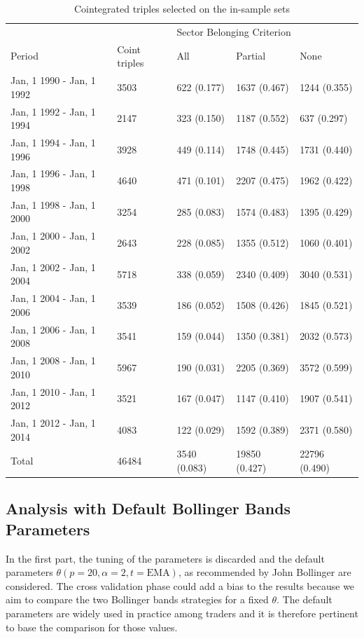 \documentclass[11pt,a4,twosided,singlespacing,titlepagenumber=on]{scrreprt}
\numberwithin{equation}{chapter} %
\theoremstyle{remark}
\begin{document}
\begin{table}[H]
\centering
\begin{tabular}{lllll}
\hline
                              && \multicolumn{3}{l}{Sector Belonging Criterion}  \\
Period & Coint triples & All & Partial & None \\
\hline
Jan, 1 1990 - Jan, 1 1992 & 3503    & 622 (0.177) & 1637 (0.467) & 1244 (0.355) \\
Jan, 1 1992 - Jan, 1 1994 & 2147    & 323 (0.150) & 1187 (0.552)  & 637 (0.297) \\
Jan, 1 1994 - Jan, 1 1996 & 3928    & 449 (0.114) & 1748 (0.445)  & 1731 (0.440) \\
Jan, 1 1996 - Jan, 1 1998 & 4640    & 471 (0.101) & 2207 (0.475)  & 1962 (0.422) \\
Jan, 1 1998 - Jan, 1 2000 & 3254    & 285 (0.083) & 1574 (0.483)  & 1395 (0.429) \\
Jan, 1 2000 - Jan, 1 2002 & 2643    & 228 (0.085) & 1355 (0.512)  & 1060 (0.401)\\
Jan, 1 2002 - Jan, 1 2004 & 5718    & 338 (0.059) & 2340 (0.409)  & 3040 (0.531) \\
Jan, 1 2004 - Jan, 1 2006 & 3539    & 186 (0.052) & 1508 (0.426)  & 1845 (0.521) \\
Jan, 1 2006 - Jan, 1 2008 & 3541    & 159 (0.044) & 1350 (0.381)  & 2032 (0.573) \\
Jan, 1 2008 - Jan, 1 2010 & 5967    & 190 (0.031) & 2205 (0.369)  & 3572 (0.599) \\
Jan, 1 2010 - Jan, 1 2012 & 3521    & 167 (0.047) & 1147 (0.410)  & 1907 (0.541) \\
Jan, 1 2012 - Jan, 1 2014 & 4083    & 122 (0.029) & 1592 (0.389)  & 2371 (0.580) \\
\hline
Total & 46484 & 3540 (0.083) & 19850 (0.427) & 22796 (0.490) \\
\hline
\end{tabular}
\caption{Cointegrated triples selected on the in-sample sets}
\label{tab:calibration_selection}
\end{table}

\subsection{Analysis with Default Bollinger Bands Parameters}

In the first part, the tuning of the parameters is discarded and the default parameters $\theta (p=20, \alpha = 2, t = \text{EMA})$, as recommended by John Bollinger are considered. The cross validation phase could add a bias to the results because we aim to compare the two Bollinger bands strategies for a fixed $\theta$. The default parameters are widely used in practice among traders and it is therefore pertinent to base the comparison for those values. 
\end{document}
